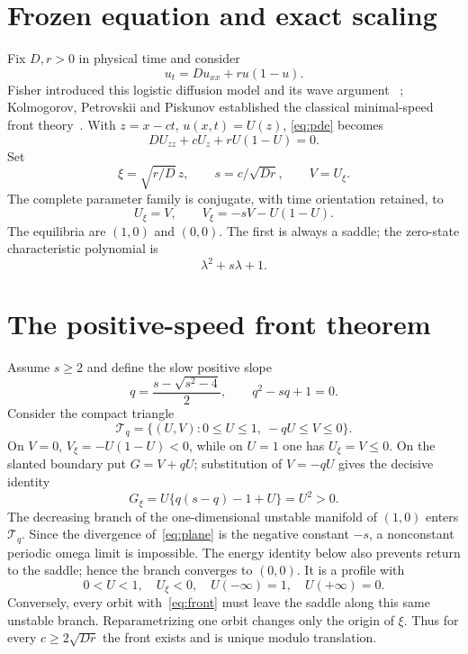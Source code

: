\documentclass[9pt]{extarticle}
\begin{document}
\section{Frozen equation and exact scaling}
Fix $D,r>0$ in physical time and consider
\begin{equation}\label{eq:pde}
 u_t=D u_{xx}+r u(1-u).
\end{equation}
Fisher introduced this logistic diffusion model and its wave argument
~\cite{F37}; Kolmogorov, Petrovskii and Piskunov established the classical
minimal-speed front theory~\cite{KPP37}.  With $z=x-ct$, $u(x,t)=U(z)$,
\eqref{eq:pde} becomes
\begin{equation}\label{eq:physical}
 D U_{zz}+cU_z+rU(1-U)=0.
\end{equation}
Set
\[
 \xi=\sqrt{r/D}\,z,\qquad s=c/\sqrt{Dr},\qquad V=U_\xi .
\]
The complete parameter family is conjugate, with time orientation retained,
to
\begin{equation}\label{eq:plane}
 U_\xi=V,\qquad V_\xi=-sV-U(1-U).
\end{equation}
The equilibria are $(1,0)$ and $(0,0)$.  The first is always a saddle; the
zero-state characteristic polynomial is
\begin{equation}\label{eq:zerochar}
 \lambda^2+s\lambda+1.
\end{equation}

\section{The positive-speed front theorem}
Assume $s\ge2$ and define the slow positive slope
\[
 q=\frac{s-\sqrt{s^2-4}}2,\qquad q^2-sq+1=0.
\]
Consider the compact triangle
\begin{equation}\label{eq:triangle}
 \mathcal T_q=\{(U,V):0\le U\le1,\ -qU\le V\le0\}.
\end{equation}
On $V=0$, $V_\xi=-U(1-U)<0$, while on $U=1$ one has
$U_\xi=V\le0$.  On the slanted boundary put $G=V+qU$; substitution of
$V=-qU$ gives the decisive identity
\begin{equation}\label{eq:inward}
 G_\xi=U\{q(s-q)-1+U\}=U^2>0.
\end{equation}
The decreasing branch of the one-dimensional unstable manifold of $(1,0)$
enters $\mathcal T_q$.  Since the divergence of~\eqref{eq:plane} is the
negative constant $-s$, a nonconstant periodic omega limit is impossible.
The energy identity below also prevents return to the saddle; hence the branch
converges to $(0,0)$.  It is a profile with
\begin{equation}\label{eq:front}
 0<U<1,\quad U_\xi<0,\quad U(-\infty)=1,\quad U(+\infty)=0.
\end{equation}
Conversely, every orbit with~\eqref{eq:front} must leave the saddle along this
same unstable branch.  Reparametrizing one orbit changes only the origin of
$\xi$.  Thus for every $c\ge2\sqrt{Dr}$ the front exists and is unique modulo
translation.
\end{document}
